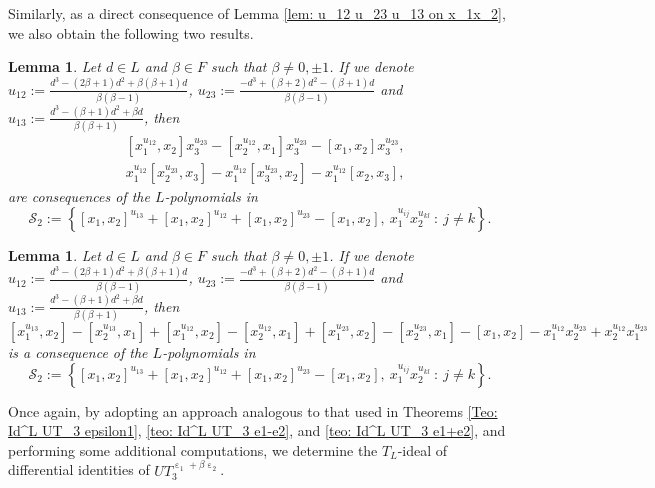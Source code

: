\documentclass[a4paper,reqno]{amsart}
\newtheorem{lemma}[theorem]{Lemma}
\theoremstyle{definition}
\numberwithin{equation}{section}
\numberwithin{theorem}{section}
\DeclareMathOperator{\e}{\varepsilon}
\begin{document}
Similarly, as a direct consequence of Lemma \ref{lem: u_12 u_23 u_13 on x_1x_2}, we also obtain the following two results.

\begin{lemma}\label{lem: UT_3^e1+be2 u_12 u_23 ordering 2}
    Let $d\in L$ and $\beta\in F$ such that $\beta\neq 0, \pm 1$. If we denote $u_{12}:=\frac{d^3- (2\beta+1)d^2+\beta(\beta+1)d}{\beta(\beta-1)}$, $u_{23}:=\frac{-d^3+(\beta+2)d^2-(\beta+1)d}{\beta(\beta-1)}$ and $u_{13}:=\frac{d^3-(\beta+1)d^2+\beta d}{\beta(\beta+1)}$, then
    \begin{align*}
        & [x_1^{u_{12}},x_2] x_3^{u_{23}} - [x_2^{u_{12}},x_1] x_3^{u_{23}}-[x_1,x_2]x_3^{u_{23}},\\
        & x_1^{u_{12}} [x_2^{u_{23}},x_3] - x_1^{u_{12}} [x_3^{u_{23}},x_2]-x_1^{u_{12}}[x_2,x_3],
    \end{align*}
are consequences of the $L$-polynomials in
$$\mathcal{S}_2:=\left\{ [x_1,x_2]^{u_{13}}+ [x_1,x_2]^{u_{12}} + [x_1,x_2]^{u_{23}} - [x_1,x_2],\ x_1^{u_{ij}}x_2^{u_{kl}}\ : \  j\neq k \right\}.$$
\end{lemma}


\begin{lemma}\label{lem: UT_3^e1+be2 u_13 ordering}
    Let $d\in L$ and $\beta\in F$ such that $\beta\neq 0, \pm 1$. If we denote $u_{12}:=\frac{d^3- (2\beta+1)d^2+\beta(\beta+1)d}{\beta(\beta-1)}$, $u_{23}:=\frac{-d^3+(\beta+2)d^2-(\beta+1)d}{\beta(\beta-1)}$ and $u_{13}:=\frac{d^3-(\beta+1)d^2+\beta d}{\beta(\beta+1)}$, then
    $$
    [x_1^{u_{13}}, x_2]- [x_2^{u_{13}}, x_1] +[x_1^{u_{12}}, x_2]- [x_2^{u_{12}}, x_1] +[x_1^{u_{23}}, x_2]- [x_2^{u_{23}}, x_1]  - [x_1, x_2] -x_1^{u_{12}}x_2^{u_{23}} + x_2^{u_{12}}x_1^{u_{23}}
    $$
is a consequence of the $L$-polynomials in
$$\mathcal{S}_2:=\left\{ [x_1,x_2]^{u_{13}}+ [x_1,x_2]^{u_{12}} + [x_1,x_2]^{u_{23}} - [x_1,x_2],\ x_1^{u_{ij}}x_2^{u_{kl}}\ : \  j\neq k \right\}.$$
\end{lemma}






Once again, by adopting an approach analogous to that used in Theorems \ref{Teo: Id^L UT_3 epsilon1}, \ref{teo: Id^L UT_3 e1-e2}, and \ref{teo: Id^L UT_3 e1+e2}, and performing some additional computations, we determine the $T_L$-ideal of differential identities of $UT_3^{\e_1+\beta \e_2}$.
\end{document}
